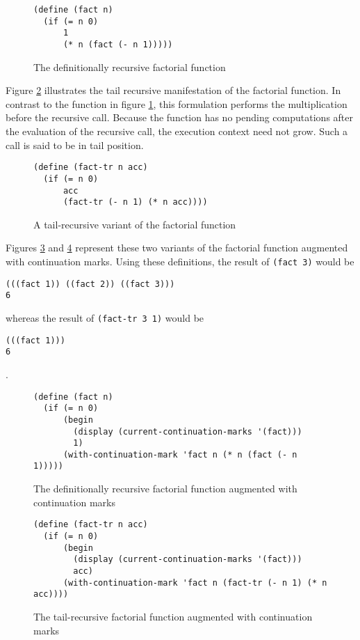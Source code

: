 \documentclass[ms,electronic,twosidetoc,letterpaper,chaptercenter,parttop]{byumsphd}
\begin{document}
\begin{figure}
\begin{verbatim}
(define (fact n)
  (if (= n 0)
      1
      (* n (fact (- n 1)))))
\end{verbatim}
\caption{The definitionally recursive factorial function}
\label{fac-rec}
\end{figure}

Figure \ref{fac-tail-rec} illustrates the tail recursive manifestation of the factorial
function. In contrast to the function in figure \ref{fac-rec}, this formulation performs
the multiplication before the recursive call. Because the function has no pending
computations after the evaluation of the recursive call, the execution context need not
grow. Such a call is said to be in tail position.

\begin{figure}
\begin{verbatim}
(define (fact-tr n acc)
  (if (= n 0)
      acc
      (fact-tr (- n 1) (* n acc))))
\end{verbatim}
\caption{A tail-recursive variant of the factorial function}
\label{fac-tail-rec}
\end{figure}

Figures \ref{fac-rec-cm} and \ref{fac-tail-rec-cm} represent these two variants of the
factorial function augmented with continuation marks. Using these definitions, the 
result of \texttt{(fact 3)} would be

\begin{verbatim}
(((fact 1)) ((fact 2)) ((fact 3)))
6
\end{verbatim}

whereas the result of \texttt{(fact-tr 3 1)} would be

\begin{verbatim}
(((fact 1)))
6
\end{verbatim}.

\begin{figure}
\begin{verbatim}
(define (fact n)
  (if (= n 0)
      (begin
        (display (current-continuation-marks '(fact)))
        1)
      (with-continuation-mark 'fact n (* n (fact (- n 1)))))
\end{verbatim}
\caption{The definitionally recursive factorial function augmented with continuation marks}
\label{fac-rec-cm}
\end{figure}

\begin{figure}
\begin{verbatim}
(define (fact-tr n acc)
  (if (= n 0)
      (begin
        (display (current-continuation-marks '(fact)))
        acc)
      (with-continuation-mark 'fact n (fact-tr (- n 1) (* n acc))))
\end{verbatim}
\caption{The tail-recursive factorial function augmented with continuation marks}
\label{fac-tail-rec-cm}
\end{figure}
\end{document}

